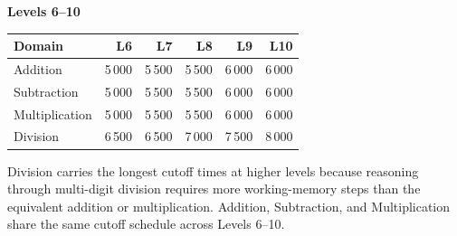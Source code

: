 \documentclass[11pt]{article}
\begin{document}
\noindent\textbf{Levels 6--10}
\begin{center}
\begin{tabular}{@{}lrrrrr@{}}
\toprule
\textbf{Domain} & \textbf{L6} & \textbf{L7} & \textbf{L8} & \textbf{L9} & \textbf{L10} \\
\midrule
Addition        & 5\,000 & 5\,500 & 5\,500 & 6\,000 & 6\,000 \\
Subtraction     & 5\,000 & 5\,500 & 5\,500 & 6\,000 & 6\,000 \\
Multiplication  & 5\,000 & 5\,500 & 5\,500 & 6\,000 & 6\,000 \\
Division        & 6\,500 & 6\,500 & 7\,000 & 7\,500 & 8\,000 \\
\bottomrule
\end{tabular}
\end{center}

Division carries the longest cutoff times at higher levels because reasoning through multi-digit
division requires more working-memory steps than the equivalent addition or multiplication.
Addition, Subtraction, and Multiplication share the same cutoff schedule across Levels 6--10.
\end{document}
